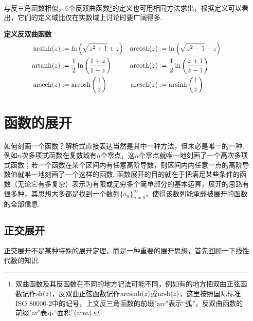 \documentclass[UTF8]{ctexart}
\newenvironment{definition}[1]
    {\begin{tcolorbox}[enhanced, colback=LightYellow, breakable=false, frame hidden, borderline west={1.5mm}{-2mm}{DarkGreen}]
    {\bfseries {\color{DarkGreen} 定义}\quad #1} \newline}
    {\end{tcolorbox}}
\begin{document}
与反三角函数相似，6个反双曲函数\footnote{双曲函数及其反函数在不同的地方记法可能不同，例如有的地方把双曲正弦函数记作\({\rm sh}(z)\)，反双曲正弦函数记作\({\rm arcsinh}(z)\)或\({\rm arsh}(z)\)，这里按照国际标准ISO 80000-2中的记号，上文反三角函数的前缀"arc"表示“弧”，反双曲函数的前缀"ar"表示“面积”(area).}的定义也可用相同方法求出，根据定义可以看出，它们的定义域比仅在实数域上讨论时要广阔得多.
\begin{definition}{反双曲函数}
    \[
        \begin{aligned}
            {\rm arsinh}(z) &:= \ln\left(\sqrt{z^2+1}+z\right) & {\rm arcosh}(z) &:= \ln\left(\sqrt{z^2-1}+z\right) \\
            {\rm artanh}(z) &:= \frac{1}{2}\ln\left(\frac{1+z}{1-z}\right) & {\rm arcoth}(z) &:= \frac{1}{2}\ln\left(\frac{z+1}{z-1}\right) \\
            {\rm arsech}(z) &:= {\rm arcosh}\left(\frac{1}{z}\right) & {\rm arcsch}(z) &:= {\rm arsinh}\left(\frac{1}{z}\right)
        \end{aligned}
    \]
\end{definition}

\section{函数的展开}

如何刻画一个函数？解析式直接表达当然是其中一种方法，但未必是唯一的一种. 例如\(n\)次多项式函数在复数域有\(n\)个零点，这\(n\)个零点就唯一地刻画了一个高次多项式函数；若一个函数在某个区间内有任意高阶导数，则区间内内任意一点的高阶导数值就唯一地刻画了一个这样的函数. 函数展开的目的就在于把满足某些条件的函数（无论它有多复杂）表示为有限或无穷多个简单部分的基本运算，展开的思路有很多种，其思想大多都是找到一个数列\(\{a_n\}_{n=0}^{\infty}\)，使得该数列能承载被展开的函数的全部信息.

\subsection{正交展开}

正交展开不是某种特殊的展开定理，而是一种重要的展开思想，首先回顾一下线性代数的知识.
\end{document}
